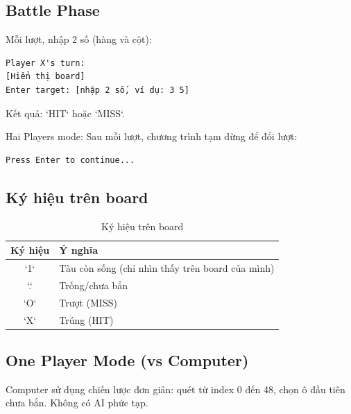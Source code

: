 \subsection{Battle Phase}

Mỗi lượt, nhập 2 số (hàng và cột):

\begin{verbatim}
Player X's turn:
[Hiển thị board]
Enter target: [nhập 2 số, ví dụ: 3 5]
\end{verbatim}

Kết quả: `HIT` hoặc `MISS`.

Hai Players mode: Sau mỗi lượt, chương trình tạm dừng để đổi lượt:

\begin{verbatim}
Press Enter to continue...
\end{verbatim}

\subsection{Ký hiệu trên board}

\begin{table}[H]
\centering
\begin{tabular}{|c|l|}
\hline
\textbf{Ký hiệu} & \textbf{Ý nghĩa} \\
\hline
`1` & Tàu còn sống (chỉ nhìn thấy trên board của mình) \\
\hline
`.` & Trống/chưa bắn \\
\hline
`O` & Trượt (MISS) \\
\hline
`X` & Trúng (HIT) \\
\hline
\end{tabular}
\caption{Ký hiệu trên board}
\end{table}

\subsection{One Player Mode (vs Computer)}

Computer sử dụng chiến lược đơn giản: quét từ index 0 đến 48, chọn ô đầu tiên chưa bắn. Không có AI phức tạp.


